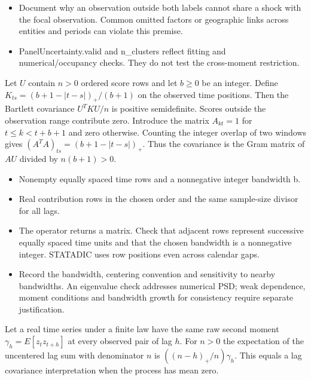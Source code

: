 \expandafter\def\csname statadic@diagnostics@STATADIC-PANELCOV-002\endcsname{\begin{itemize}
\item Document why an observation outside both labels cannot share a shock with the focal observation. Common omitted factors or geographic links across entities and periods can violate this premise.
\item PanelUncertainty.valid and n\_clusters reflect fitting and numerical/occupancy checks. They do not test the cross-moment restriction.
\end{itemize}}
\expandafter\def\csname statadic@statement@STATADIC-HAC-001\endcsname{Let $U$ contain $n>0$ ordered score rows and let
  $b\ge0$ be an integer. Define $K_{ts}=(b+1-|t-s|)_+/(b+1)$ on the
  observed time positions. Then the Bartlett covariance $U^TKU/n$ is
  positive semidefinite. Scores outside the observation range contribute zero.}
\expandafter\def\csname statadic@proof@STATADIC-HAC-001\endcsname{Introduce the matrix $A_{kt}=1$ for $t\le k<t+b+1$
  and zero otherwise. Counting the integer overlap of two windows gives
  $(A^TA)_{ts}=(b+1-|t-s|)_+$. Thus the covariance is the Gram matrix
  of $AU$ divided by $n(b+1)>0$.}
\expandafter\def\csname statadic@assumptions@STATADIC-HAC-001\endcsname{\begin{itemize}
\item Nonempty equally spaced time rows and a nonnegative integer bandwidth b.
\item Real contribution rows in the chosen order and the same sample-size divisor for all lags.
\end{itemize}}
\expandafter\def\csname statadic@diagnostics@STATADIC-HAC-001\endcsname{\begin{itemize}
\item The operator returns a matrix. Check that adjacent rows represent successive equally spaced time units and that the chosen bandwidth is a nonnegative integer. STATADIC uses row positions even across calendar gaps.
\item Record the bandwidth, centering convention and sensitivity to nearby bandwidths. An eigenvalue check addresses numerical PSD; weak dependence, moment conditions and bandwidth growth for consistency require separate justification.
\end{itemize}}
\expandafter\def\csname statadic@statement@STATADIC-HAC-002\endcsname{Let a real time series under a finite law have the same
  raw second moment $\gamma_h=E[z_t z_{t+h}]$ at every observed pair of lag
  $h$. For $n>0$ the expectation of the uncentered lag sum with denominator
  $n$ is $((n-h)_+/n)\gamma_h$. This equals a lag covariance interpretation
  when the process has mean zero.}
